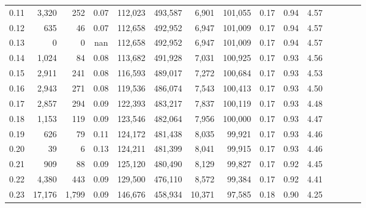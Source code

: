 \begin{tabular}{rrrcrrrrrrrrrrr}
0.11 &   3,320 &    252 &                                       0.07 &  112,023 &  493,587 &    6,901 &  101,055 &  0.17 &  0.94 &                         4.57 \\
0.12 &     635 &     46 &                                       0.07 &  112,658 &  492,952 &    6,947 &  101,009 &  0.17 &  0.94 &                         4.57 \\
0.13 &       0 &      0 &                                        nan &  112,658 &  492,952 &    6,947 &  101,009 &  0.17 &  0.94 &                         4.57 \\
0.14 &   1,024 &     84 &                                       0.08 &  113,682 &  491,928 &    7,031 &  100,925 &  0.17 &  0.93 &                         4.56 \\
0.15 &   2,911 &    241 &                                       0.08 &  116,593 &  489,017 &    7,272 &  100,684 &  0.17 &  0.93 &                         4.53 \\
0.16 &   2,943 &    271 &                                       0.08 &  119,536 &  486,074 &    7,543 &  100,413 &  0.17 &  0.93 &                         4.50 \\
0.17 &   2,857 &    294 &                                       0.09 &  122,393 &  483,217 &    7,837 &  100,119 &  0.17 &  0.93 &                         4.48 \\
0.18 &   1,153 &    119 &                                       0.09 &  123,546 &  482,064 &    7,956 &  100,000 &  0.17 &  0.93 &                         4.47 \\
0.19 &     626 &     79 &                                       0.11 &  124,172 &  481,438 &    8,035 &   99,921 &  0.17 &  0.93 &                         4.46 \\
0.20 &      39 &      6 &                                       0.13 &  124,211 &  481,399 &    8,041 &   99,915 &  0.17 &  0.93 &                         4.46 \\
0.21 &     909 &     88 &                                       0.09 &  125,120 &  480,490 &    8,129 &   99,827 &  0.17 &  0.92 &                         4.45 \\
0.22 &   4,380 &    443 &                                       0.09 &  129,500 &  476,110 &    8,572 &   99,384 &  0.17 &  0.92 &                         4.41 \\
0.23 &  17,176 &  1,799 &                                       0.09 &  146,676 &  458,934 &   10,371 &   97,585 &  0.18 &  0.90 &                         4.25 \\

\end{tabular}
